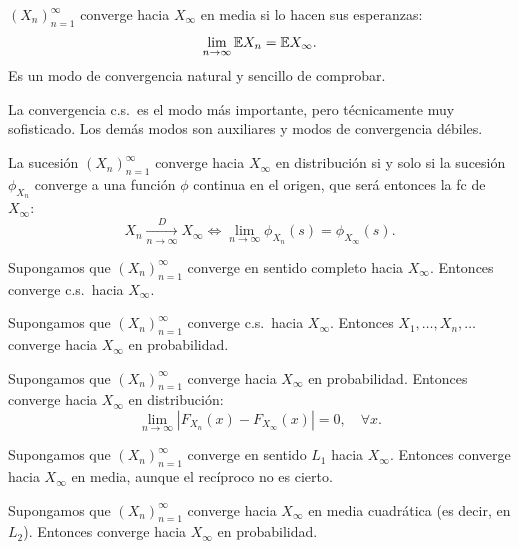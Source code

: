 \textcolor{azulresalt}{
\begin{definicion}[31]
$(X_n)_{n=1}^\infty$ converge hacia $X_\infty$ en media si lo hacen sus esperanzas:
\[
  \lim_{n\to\infty} \mathbb{E} X_n = \mathbb{E} X_\infty.
\]
Es un modo de convergencia natural y sencillo de comprobar.
\end{definicion}}

La convergencia c.s.\ es el modo más importante, pero técnicamente muy sofisticado. Los demás modos son auxiliares y modos de convergencia débiles.

\begin{teorema}
La sucesión $(X_n)_{n=1}^\infty$ converge hacia $X_\infty$ en distribución si y solo si la sucesión $\phi_{X_n}$ converge a una función $\phi$ continua en el origen, que será entonces la fc de $X_\infty$:
\[
  X_n \xrightarrow[n\to\infty]{D} X_\infty \iff \lim_{n\to\infty} \phi_{X_n}(s) = \phi_{X_\infty}(s).
\]
\end{teorema}

\begin{teorema}[6]
Supongamos que $(X_n)_{n=1}^\infty$ converge en sentido completo hacia $X_\infty$. Entonces converge c.s.\ hacia $X_\infty$.
\end{teorema}

\begin{teorema}[7]
Supongamos que $(X_n)_{n=1}^\infty$ converge c.s.\ hacia $X_\infty$. Entonces $X_1, \dots, X_n, \dots$ converge hacia $X_\infty$ en probabilidad.
\end{teorema}

\begin{teorema}[8]
Supongamos que $(X_n)_{n=1}^\infty$ converge hacia $X_\infty$ en probabilidad. Entonces converge hacia $X_\infty$ en distribución:
\[
  \lim_{n\to\infty} |F_{X_n}(x) - F_{X_\infty}(x)| = 0, \quad \forall x.
\]
\end{teorema}

\begin{teorema}[9]
Supongamos que $(X_n)_{n=1}^\infty$ converge en sentido $L_1$ hacia $X_\infty$. Entonces converge hacia $X_\infty$ en media, aunque el recíproco no es cierto.
\end{teorema}

\begin{teorema}[10]
Supongamos que $(X_n)_{n=1}^\infty$ converge hacia $X_\infty$ en media cuadrática (es decir, en $L_2$). Entonces converge hacia $X_\infty$ en probabilidad.
\end{teorema}

